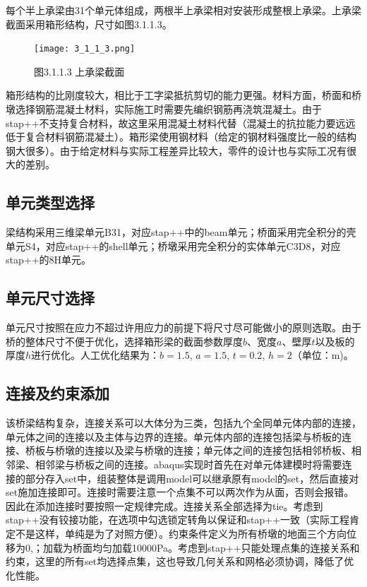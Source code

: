 \documentclass[forprint]{WHUBachelor}
\begin{document}
每个半上承梁由31个单元体组成，两根半上承梁相对安装形成整根上承梁。上承梁截面采用箱形结构，尺寸如图3.1.1.3。
\begin{figure}[H]
\centering
\texttt{[image: 3\_1\_1\_3.png]}
\caption{图3.1.1.3 上承梁截面}
\end{figure}


箱形结构的比刚度较大，相比于工字梁抵抗剪切的能力更强。材料方面，桥面和桥墩选择钢筋混凝土材料，实际施工时需要先编织钢筋再浇筑混凝土。由于stap++不支持复合材料，故这里采用混凝土材料代替（混凝土的抗拉能力要远远低于复合材料钢筋混凝土）。箱形梁使用钢材料（给定的钢材料强度比一般的结构钢大很多）。由于给定材料与实际工程差异比较大，零件的设计也与实际工况有很大的差别。

\subsection{单元类型选择}

梁结构采用三维梁单元B31，对应stap++中的beam单元；桥面采用完全积分的壳单元S4，对应stap++的shell单元；桥墩采用完全积分的实体单元C3D8，对应stap++的8H单元。

\subsection{单元尺寸选择}

单元尺寸按照在应力不超过许用应力的前提下将尺寸尽可能做小的原则选取。由于桥的整体尺寸不便于优化，选择箱形梁的截面参数厚度$b$、宽度$a$、壁厚$t$以及板的厚度$h$进行优化。人工优化结果为：$b=1.5$,
$a=1.5$, $t=0.2$, $h=2$（单位：m)。

\subsection{连接及约束添加}

该桥梁结构复杂，连接关系可以大体分为三类，包括九个全同单元体内部的连接，单元体之间的连接以及主体与边界的连接。单元体内部的连接包括梁与桥板的连接、桥板与桥墩的连接以及梁与桥墩的连接；单元体之间的连接包括相邻桥板、相邻梁、相邻梁与桥板之间的连接。abaqus实现时首先在对单元体建模时将需要连接的部分存入set中，组装整体是调用model可以继承原有model的set，然后直接对set施加连接即可。连接时需要注意一个点集不可以两次作为从面，否则会报错。因此在添加连接时要按照一定规律完成。连接关系全部选择为tie。考虑到stap++没有铰接功能，在选项中勾选锁定转角以保证和stap++一致（实际工程肯定不是这样，单纯是为了对照方便）。约束条件定义为所有桥墩的地面三个方向位移为0,；加载为桥面均匀加载10000Pa。考虑到stap++只能处理点集的连接关系和约束，这里的所有set均选择点集，这也导致几何关系和网格必须协调，降低了优化性能。
\end{document}
